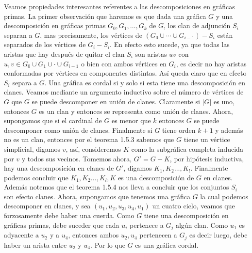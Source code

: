 Veamos propiedades interesantes referentes a las descomposiciones en gráficas primas. La primer observación que haremos es que dada una gráfica $G$ y una descomposición en gráficas primas $G_0,G_1,\dots,G_{k}$ de $G$, los clan de adjunción $S_i$ separan a $G$, mas precisamente, los vértices de $(G_0\cup \cdots \cup G_{i-1})- S_i$ están separados de los vértices de $G_i- S_i$. En efecto esto sucede, ya que todas las aristas que hay después de quitar el clan $S_i$ son aristas $uv$ con $u,v\in G_0\cup G_1 \cup \cdot \cup G_{i-1}$ o bien con ambos vértices en $G_i$, es decir no hay aristas conformadas por vértices en componentes distintas. Así queda claro que en efecto $S_i$ separa a $G$. Una gráfica es cordal si y solo si esta  tiene una descomposición en clanes. Veamos mediante un argumento inductivo sobre el número de vértices de $G$ que $G$ se puede descomponer en unión de clanes. Claramente si $|G|$ es uno, entonces $G$ es un clan y entonces se representa como unión de clanes. Ahora, supongamos que si el cardinal de $G$ es menor que $k$ entonces $G$ se puede descomponer como unión de clanes. Finalmente si $G$ tiene orden $k+1$ y además no es un clan, entonces por el teorema 1.5.3 sabemos que $G$ tiene un vértice simplicial, digamos $v$, así, consideremos $K$ como la subgráfica completa inducida por $v$ y todos sus vecinos. Tomemos ahora, $G'=G-K$, por hipótesis inductiva, hay una descomposición en clanes de $G'$, digamos $K_1,K_2\dots, K_l$. Finalmente podemos concluir que $K_1,K_2\dots, K_l, K$ es una descomposición de $G$ en clanes. Además notemos que el teorema 1.5.4 nos lleva a concluir que los conjuntos $S_i$ son efecto clanes. Ahora, supongamos que tenemos una gráfica $G$ la cual podemos descomponer en clanes, y sea $(u_1,u_2,u_3,u_4,u_1)$ un cuatro ciclo, veamos que forzosamente debe haber una cuerda. Como $G$ tiene una descomposición en gráficas primas, debe suceder que cada $u_i$ pertenece a $G_j$ algún clan. Como $u_1$ es adyacente a $u_2$ y a $u_4$, entonces ambos $u_2, u_4$ pertenecen a $G_j$ es decir luego, debe haber un arista entre $u_2$ y $u_4$. Por lo que $G$ es una gráfica cordal.

